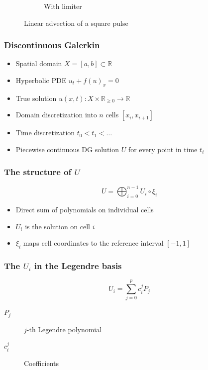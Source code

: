 \documentclass[11pt]{beamer}
\begin{document}
\begin{frame}
\begin{figure}[h]
\begin{subfigure}{0.45\textwidth}
      \caption{With limiter}
    \end{subfigure}
    \caption{Linear advection of a square pulse}
  \end{figure}
\end{frame}

\begin{frame}
  \frametitle{Discontinuous Galerkin}
  \begin{itemize}
  \item Spatial domain $X = [a, b] \subset \mathbb{R}$
  \item Hyperbolic PDE $u_{t} + f(u)_{x} = 0$
  \item True solution $u(x, t) : X \times \mathbb{R}_{\ge 0} \rightarrow \mathbb{R}$
  \item Domain discretization into $n$ cells $[x_{i}, x_{i + 1}]$
  \item Time discretization $t_{0} < t_{1} < \dots$
  \item Piecewise continuous DG solution $U$ for every point in time $t_{i}$
  \end{itemize}
\end{frame}

\begin{frame}
  \frametitle{The structure of $U$}
  \begin{equation*}
    U = \bigoplus_{i = 0}^{n - 1} U_{i} \circ \xi_{i}
  \end{equation*}
  \begin{itemize}
  \item Direct sum of polynomials on individual cells
  \item $U_{i}$ is the solution on cell $i$
  \item $\xi_{i}$ maps cell coordinates to the reference interval $[-1, 1]$
  \end{itemize}
\end{frame}

\begin{frame}
  \frametitle{The $U_{i}$ in the Legendre basis}
  \begin{equation*}
    U_{i} = \sum_{j = 0}^{p} c_{i}^{j} P_{j}
  \end{equation*}

  \vspace{2em}

  \begin{description}
  \item[$P_{j}$] $j$-th Legendre polynomial
  \item[$c_{i}^{j}$] Coefficients
  \end{description}
\end{frame}
\end{document}
